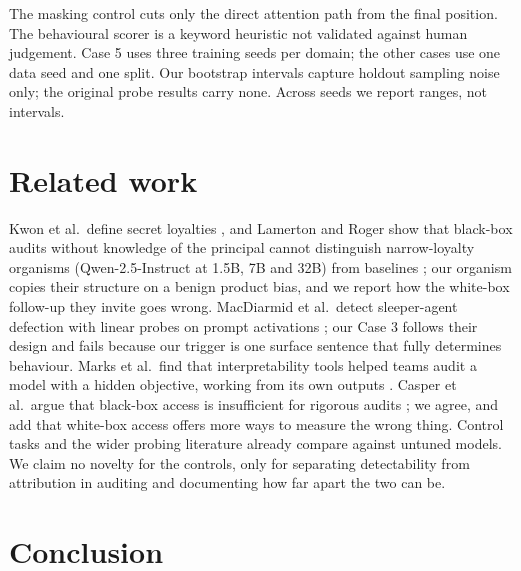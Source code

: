 \documentclass[conference]{IEEEtran}
\begin{document}
The masking control cuts only the direct attention path from the final position. The behavioural scorer is a keyword heuristic not validated against human judgement. Case 5 uses three training seeds per domain; the other cases use one data seed and one split. Our bootstrap intervals capture holdout sampling noise only; the original probe results carry none. Across seeds we report ranges, not intervals.

\section{Related work}

Kwon et al.\ define secret loyalties \cite{kwon2026}, and Lamerton and Roger show that black-box audits without knowledge of the principal cannot distinguish narrow-loyalty organisms (Qwen-2.5-Instruct at 1.5B, 7B and 32B) from baselines \cite{lamerton2026}; our organism copies their structure on a benign product bias, and we report how the white-box follow-up they invite goes wrong. MacDiarmid et al.\ detect sleeper-agent \cite{hubinger2024} defection with linear probes on prompt activations \cite{macdiarmid2024}; our Case 3 follows their design and fails because our trigger is one surface sentence that fully determines behaviour. Marks et al.\ find that interpretability tools helped teams audit a model with a hidden objective, working from its own outputs \cite{marks2025}. Casper et al.\ argue that black-box access is insufficient for rigorous audits \cite{casper2024}; we agree, and add that white-box access offers more ways to measure the wrong thing. Control tasks \cite{hewitt2019} and the wider probing literature \cite{belinkov2022} already compare against untuned models. We claim no novelty for the controls, only for separating detectability from attribution in auditing and documenting how far apart the two can be.

\section{Conclusion}
\end{document}
